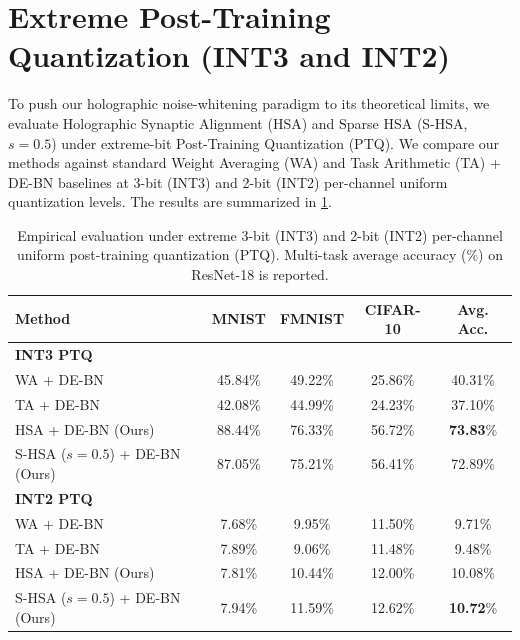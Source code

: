 \documentclass{article}
\theoremstyle{plain}
\theoremstyle{definition}
\theoremstyle{remark}
\begin{document}
\section{Extreme Post-Training Quantization (INT3 and INT2)}
\label{sec:extreme_quant}

To push our holographic noise-whitening paradigm to its theoretical limits, we evaluate Holographic Synaptic Alignment (HSA) and Sparse HSA (S-HSA, $s=0.5$) under extreme-bit Post-Training Quantization (PTQ). We compare our methods against standard Weight Averaging (WA) and Task Arithmetic (TA) + DE-BN baselines at 3-bit (INT3) and 2-bit (INT2) per-channel uniform quantization levels. The results are summarized in \cref{tab:extreme_quant}.

\begin{table}[H]
\centering
\caption{Empirical evaluation under extreme 3-bit (INT3) and 2-bit (INT2) per-channel uniform post-training quantization (PTQ). Multi-task average accuracy (\%) on ResNet-18 is reported.}
\label{tab:extreme_quant}
\vskip 0.1in
\begin{tabular}{lcccc}
\toprule
Method & MNIST & FMNIST & CIFAR-10 & Avg. Acc. \\
\midrule
\textbf{INT3 PTQ} \\
WA + DE-BN & 45.84\% & 49.22\% & 25.86\% & 40.31\% \\
TA + DE-BN & 42.08\% & 44.99\% & 24.23\% & 37.10\% \\
HSA + DE-BN (Ours) & 88.44\% & 76.33\% & 56.72\% & \textbf{73.83}\% \\
S-HSA ($s=0.5$) + DE-BN (Ours) & 87.05\% & 75.21\% & 56.41\% & 72.89\% \\
\midrule
\textbf{INT2 PTQ} \\
WA + DE-BN & 7.68\% & 9.95\% & 11.50\% & 9.71\% \\
TA + DE-BN & 7.89\% & 9.06\% & 11.48\% & 9.48\% \\
HSA + DE-BN (Ours) & 7.81\% & 10.44\% & 12.00\% & 10.08\% \\
S-HSA ($s=0.5$) + DE-BN (Ours) & 7.94\% & 11.59\% & 12.62\% & \textbf{10.72}\% \\
\bottomrule
\end{tabular}
\end{table}
\end{document}
